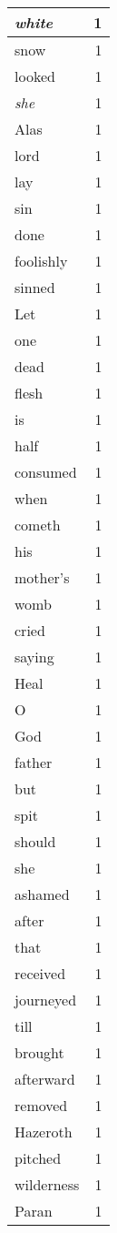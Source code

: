 \begin{center}
\begin{longtable}{l|r}
\emph{white} & 1 \\ \hline
snow & 1 \\ \hline
looked & 1 \\ \hline
\emph{she} & 1 \\ \hline
Alas & 1 \\ \hline
lord & 1 \\ \hline
lay & 1 \\ \hline
sin & 1 \\ \hline
done & 1 \\ \hline
foolishly & 1 \\ \hline
sinned & 1 \\ \hline
Let & 1 \\ \hline
one & 1 \\ \hline
dead & 1 \\ \hline
flesh & 1 \\ \hline
is & 1 \\ \hline
half & 1 \\ \hline
consumed & 1 \\ \hline
when & 1 \\ \hline
cometh & 1 \\ \hline
his & 1 \\ \hline
mother's & 1 \\ \hline
womb & 1 \\ \hline
cried & 1 \\ \hline
saying & 1 \\ \hline
Heal & 1 \\ \hline
O & 1 \\ \hline
God & 1 \\ \hline
father & 1 \\ \hline
but & 1 \\ \hline
spit & 1 \\ \hline
should & 1 \\ \hline
she & 1 \\ \hline
ashamed & 1 \\ \hline
after & 1 \\ \hline
that & 1 \\ \hline
received & 1 \\ \hline
journeyed & 1 \\ \hline
till & 1 \\ \hline
brought & 1 \\ \hline
afterward & 1 \\ \hline
removed & 1 \\ \hline
Hazeroth & 1 \\ \hline
pitched & 1 \\ \hline
wilderness & 1 \\ \hline
Paran & 1 \\ \hline
\end{longtable}
\end{center}



